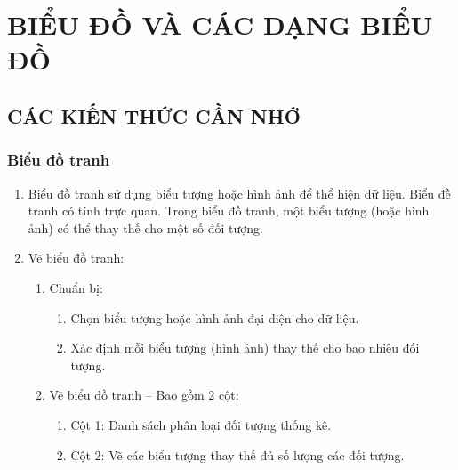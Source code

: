 \def\i{\item}
\graphicspath{{../pictures/c5/}}
\newpage
\section{BIỂU ĐỒ VÀ CÁC DẠNG BIỂU ĐỒ}
\subsection{CÁC KIẾN THỨC CẦN NHỚ}
\subsubsection{Biểu đồ tranh}
\begin{enumerate}[--,leftmargin=*]
	\i Biểu đồ tranh sử dụng biểu tượng hoặc hình ảnh để thể hiện dữ liệu. Biểu đề tranh có tính trực quan. Trong biểu đồ tranh, một biểu tượng (hoặc hình ảnh) có thể thay thế cho một số đối tượng.
	\i Vẽ biểu đồ tranh:
	\begin{enumerate}[Bước 1.,leftmargin=*]
		\i Chuẩn bị:
		\begin{enumerate}[+,leftmargin=*]
			\i Chọn biểu tượng hoặc hình ảnh đại diện cho dữ liệu.
			\i Xác định mỗi biểu tượng (hình ảnh) thay thế cho bao nhiêu đối tượng.
		\end{enumerate} 
		\i Vẽ biểu đồ tranh
		-- Bao gồm 2 cột:
		\begin{enumerate}[+,leftmargin=*]
			\i Cột 1: Danh sách phân loại đối tượng thống kê.
			\i Cột 2: Vẽ các biểu tượng thay thế đủ số lượng các đối tượng.
		\end{enumerate}
	\end{enumerate}
\end{enumerate}

